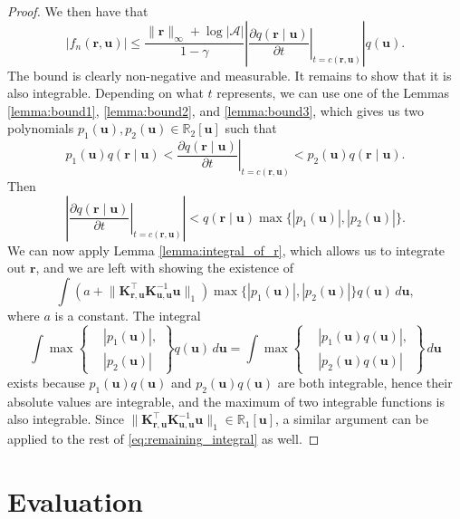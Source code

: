 \documentclass{mpaper}
\newcommand{\vbound}{\frac{\rinf + \log|\mathcal{A}|}{1 - \gamma}}
\newcommand{\rinf}{\lVert \mathbf{r} \rVert_\infty}
\newcommand{\fn}{f_n(\mathbf{r}, \mathbf{u})}
\newcommand{\Kuu}{\mathbf{K}_{\mathbf{u},\mathbf{u}}}
\newcommand{\Kru}{\mathbf{K}_{\mathbf{r},\mathbf{u}}}
\begin{document}
\begin{proof}
  We then have that
  \[
    |\fn| \le \vbound \left| \left. \frac{\partial
          q(\mathbf{r} \mid \mathbf{u})}{\partial t} \right|_{t=c(\mathbf{r}, \mathbf{u})}
    \right| q(\mathbf{u}).
  \]
  The bound is clearly non-negative and measurable. It remains to show that it
  is also integrable. Depending on what $t$ represents, we can use one of the
  Lemmas \ref{lemma:bound1}, \ref{lemma:bound2}, and \ref{lemma:bound3}, which
  gives us two polynomials $p_1(\mathbf{u}), p_2(\mathbf{u}) \in
  \mathbb{R}_2[\mathbf{u}]$ such that
  \[
    p_1(\mathbf{u})q(\mathbf{r} \mid \mathbf{u}) < \left. \frac{\partial q(\mathbf{r} \mid \mathbf{u})}{\partial
        t} \right|_{t=c(\mathbf{r}, \mathbf{u})} < p_2(\mathbf{u})q(\mathbf{r} \mid \mathbf{u}).
  \]
  Then
  \[
    \left| \left. \frac{\partial q(\mathbf{r} \mid \mathbf{u})}{\partial t}
      \right|_{t=c(\mathbf{r}, \mathbf{u})} \right| < q(\mathbf{r} \mid \mathbf{u}) \max \{
    |p_1(\mathbf{u})|, |p_2(\mathbf{u})| \}.
  \]
  We can now apply Lemma \ref{lemma:integral_of_r}, which allows us to integrate
  out $\mathbf{r}$, and we are left with showing the existence of
  \begin{equation} \label{eq:remaining_integral}
    \int \left( a + \lVert \Kru^\intercal \Kuu^{-1} \mathbf{u} \rVert_1 \right) \max \{|p_1(\mathbf{u})|, |p_2(\mathbf{u})| \} q(\mathbf{u})\,d\mathbf{u},
  \end{equation}
  where $a$ is a constant. The integral
  \[
    \int \max \left\{
      \begin{aligned}
        &|p_1(\mathbf{u})|, \\
        &|p_2(\mathbf{u})|
      \end{aligned}
    \right\} q(\mathbf{u})\,d\mathbf{u} = \int \max \left\{
      \begin{aligned}
        &|p_1(\mathbf{u})q(\mathbf{u})|, \\
        &|p_2(\mathbf{u})q(\mathbf{u})|
      \end{aligned}
    \right\}\,d\mathbf{u}
  \]
  exists because $p_1(\mathbf{u})q(\mathbf{u})$ and
  $p_2(\mathbf{u})q(\mathbf{u})$ are both integrable, hence their absolute
  values are integrable, and the maximum of two integrable functions is also
  integrable. Since $\lVert \Kru^\intercal \Kuu^{-1} \mathbf{u} \rVert_1 \in
  \mathbb{R}_1[\mathbf{u}]$, a similar argument can be applied to the rest of
  \eqref{eq:remaining_integral} as well.
\end{proof}

\section{Evaluation} %
\end{document}
